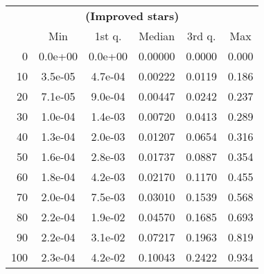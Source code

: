 \begin{tabular}{r|ccccc}
  \multicolumn{6}{c}{{\bf  (Improved stars)}} \\
  & Min & 1st q. & Median & 3rd q. & Max \\ \hline\hline
  0 & 0.0e+00 & 0.0e+00 & 0.00000 & 0.0000 & 0.000
\\ 10 & 3.5e-05 & 4.7e-04 & 0.00222 & 0.0119 & 0.186
\\ 20 & 7.1e-05 & 9.0e-04 & 0.00447 & 0.0242 & 0.237
\\ 30 & 1.0e-04 & 1.4e-03 & 0.00720 & 0.0413 & 0.289
\\ 40 & 1.3e-04 & 2.0e-03 & 0.01207 & 0.0654 & 0.316
\\ 50 & 1.6e-04 & 2.8e-03 & 0.01737 & 0.0887 & 0.354
\\ 60 & 1.8e-04 & 4.2e-03 & 0.02170 & 0.1170 & 0.455
\\ 70 & 2.0e-04 & 7.5e-03 & 0.03010 & 0.1539 & 0.568
\\ 80 & 2.2e-04 & 1.9e-02 & 0.04570 & 0.1685 & 0.693
\\ 90 & 2.2e-04 & 3.1e-02 & 0.07217 & 0.1963 & 0.819
\\ 100 & 2.3e-04 & 4.2e-02 & 0.10043 & 0.2422 & 0.934
\end{tabular}
